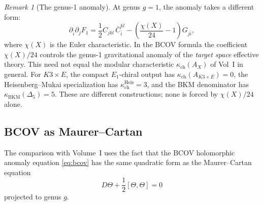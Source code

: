\documentclass[11pt]{amsart}
\theoremstyle{plain}
\theoremstyle{definition}
\theoremstyle{remark}
\newtheorem{remark}[theorem]{Remark}
\begin{document}
\begin{remark}[The genus-1 anomaly]
At genus $g = 1$, the anomaly takes a different form:
\[
 \partial_{\bar{i}} \partial_j F_1 = \frac{1}{2} C_{jkl}\, \bar{C}^{kl}_{\bar{i}}
 - \left(\frac{\chi(X)}{24} - 1\right) G_{j\bar{i}},
\]
where $\chi(X)$ is the Euler characteristic. In the BCOV formula the
coefficient $\chi(X)/24$ controls the genus-1 gravitational anomaly of
the \emph{target space} effective theory. This need not equal the
modular characteristic $\kappa_{\mathrm{ch}}(A_X)$ of Vol~I in general.
For $K3 \times E$, the compact $E_1$-chiral output has
$\kappa_{\mathrm{ch}}(A_{K3\times E})=0$, the Heisenberg--Mukai
specialization has $\kappa_{\mathrm{ch}}^{\mathrm{Heis}}=3$, and the
BKM denominator has $\kappa_{\mathrm{BKM}}(\Delta_5)=5$. These are
different constructions; none is forced by $\chi(X)/24$ alone.
\end{remark}

\subsection{BCOV as Maurer--Cartan}
\label{sub:bcov-mc}

The comparison with Volume~I uses the fact that the BCOV holomorphic
anomaly equation \eqref{eq:bcov} has the same quadratic form as the
Maurer--Cartan equation
\begin{equation}\label{eq:mc}
 D\Theta + \frac{1}{2}[\Theta, \Theta] = 0
\end{equation}
projected to genus $g$.
\end{document}
